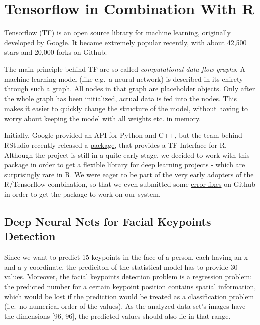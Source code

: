 \documentclass[]{article}
\begin{document}
\section{Tensorflow in Combination With
R}\label{tensorflow-in-combination-with-r}

Tensorflow (TF) is an open source library for machine learning,
originally developed by Google. It became extremely popular recently,
with about 42,500 stars and 20,000 forks on Github.

The main principle behind TF are so called \emph{computational data flow
graphs}. A machine learning model (like e.g.~a neural network) is
described in its enirety through such a graph. All nodes in that graph
are placeholder objects. Only after the whole graph has been
initialized, actual data is fed into the nodes. This makes it easier to
quickly change the structure of the model, without having to worry about
keeping the model with all weights etc. in memory.

Initially, Google provided an API for Python and C++, but the team
behind RStudio recently released a
\href{https://github.com/rstudio/tensorflow}{package}, that provides a
TF Interface for R. Although the project is still in a quite early
stage, we decided to work with this package in order to get a flexible
library for deep learning projects - which are surprisingly rare in R.
We were eager to be part of the very early adopters of the R/Tensorflow
combination, so that we even submitted some
\href{https://github.com/rstudio/tensorflow/issues/37}{error fixes} on
Github in order to get the package to work on our system.

\subsection{Deep Neural Nets for Facial Keypoints
Detection}\label{deep-neural-nets-for-facial-keypoints-detection}

Since we want to predict 15 keypoints in the face of a person, each
having an x- and a y-coordinate, the prediciton of the statistical model
has to provide 30 values. Moreover, the facial keypoints detection
problem is a regression problem: the predicted number for a certain
keypoint position contains spatial information, which would be lost if
the prediction would be treated as a classification problem (i.e.~no
numerical order of the values). As the analyzed data set's images have
the dimensions {[}96, 96{]}, the predicted values should also lie in
that range.
\end{document}
